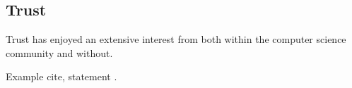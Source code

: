 \documentclass[letterpaper]{article} %
\begin{document}
\subsection{Trust}
Trust has enjoyed an extensive interest from both within the computer science community and without.

Example cite, statement \cite{lee}.




\end{document}
